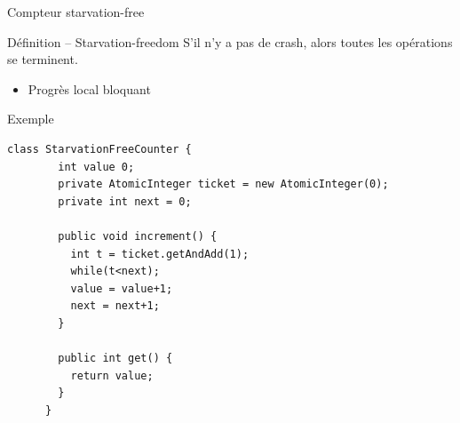 
\begingroup

\begin{frame}[fragile]{Compteur starvation-free}

  \begin{block}{Définition -- Starvation-freedom}
    \alert{S'il n'y a pas de crash}, alors toutes les opérations se terminent.
    \begin{itemize}
    \item Progrès local bloquant
    \end{itemize}
  \end{block}

  \begin{exampleblock}{Exemple}
    \begin{lstlisting}[gobble=6]
      class StarvationFreeCounter {
        int value 0;
        private AtomicInteger ticket = new AtomicInteger(0);
        private int next = 0;
        
        public void increment() {
          int t = ticket.getAndAdd(1);
          while(t<next);
          value = value+1;
          next = next+1;
        }
        
        public int get() {
          return value;
        }
      }
    \end{lstlisting}
  \end{exampleblock}
  
\end{frame}

\endgroup
\endinput
